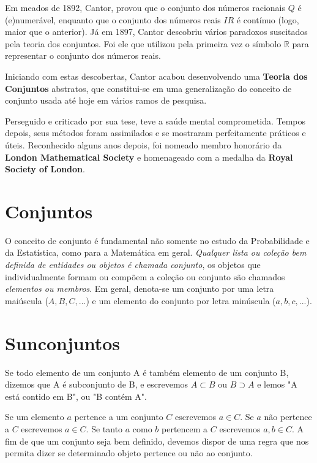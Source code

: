 \inic Em meados de 1892, Cantor, provou que o conjunto dos números racionais $Q$ é (e)numerável, enquanto que o conjunto dos números reais $IR$ é contínuo (logo, maior que o anterior). Já em 1897, Cantor descobriu vários paradoxos suscitados pela teoria dos conjuntos. Foi ele que utilizou pela primeira vez o símbolo ${\displaystyle \mathbb {R}}$ para representar o conjunto dos números reais.\vskip0.3cm


\inic Iniciando com estas descobertas, Cantor acabou desenvolvendo uma \textbf{Teoria dos Conjuntos} abstratos, que constitui-se em uma generalização do conceito de conjunto usada até hoje em vários ramos de pesquisa. \vskip0.3cm


Perseguido e criticado por sua tese, teve a saúde mental comprometida. Tempos depois, seus métodos foram assimilados e se mostraram perfeitamente práticos e úteis. Reconhecido alguns anos depois, foi nomeado membro honorário da \textbf{London Mathematical Society} e homenageado com a medalha da \textbf{Royal Society of London}.\vskip0.3cm




\section{Conjuntos}

O conceito de conjunto é fundamental não somente no estudo da
Probabilidade e da Estatística, como para a Matemática em geral.
\emph{Qualquer lista ou coleção bem definida de entidades ou
objetos é chamada conjunto}, os objetos que individualmente formam
ou compõem a coleção ou conjunto são chamados \emph{elementos ou
membros}. Em geral, denota-se um conjunto por uma letra maiúscula
($A,B,C,...$) e um elemento do conjunto por letra minúscula
($a,b,c,...$).\vskip0.3cm

\section{Sunconjuntos}

Se todo elemento de um conjunto A é também elemento de um conjunto
B, dizemos que A é subconjunto de B, e escrevemos $A \subset B $
ou $B \supset A$ e lemos "A está contido em B", ou "B contém
A".\vskip0.3cm

Se um elemento $a$ pertence a um conjunto $C$ escrevemos $a \in
C$. Se $a$ não pertence a $C$ escrevemos $a \in C$. Se tanto $a$
como $b$ pertencem a $C$ escrevemos $a,b \in C$. A fim de que um
conjunto seja bem definido, devemos dispor de uma regra que nos
permita dizer se determinado objeto pertence ou não ao
conjunto.\vskip0.3cm

